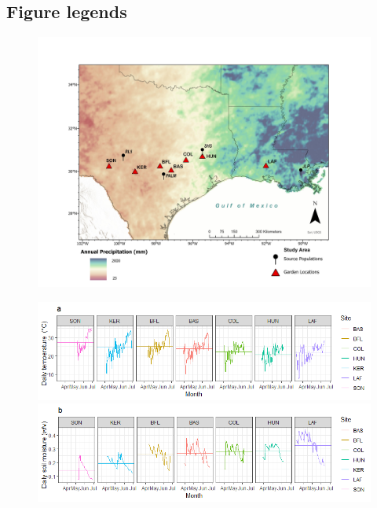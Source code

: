 \documentclass[12pt,english]{article}
\begin{document}
\begin{spacing}{1.9}
\section*{Figure legends}
\begin{figure}[H]
  \begin{center}
   \includegraphics[width=0.99\linewidth]{Figures/Study_site.jpg}
  \caption{}
  \label{fig:site}
  \end{center}
\end{figure}

\begin{figure}[H]
  \begin{center}
   \includegraphics[width=0.98\linewidth]{Figures/Temperature.png}
  \includegraphics[width=0.98\linewidth]{Figures/Soil_moisture.png}
  \caption{}
  \label{fig:gradient}
  \end{center}
\end{figure}



\end{spacing}
\end{document}
